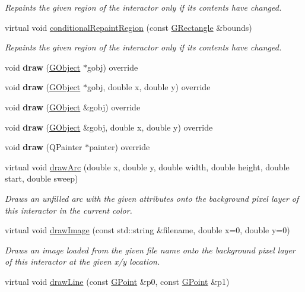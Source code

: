 \begin{DoxyCompactItemize}
\begin{DoxyCompactList}\small\item\em Repaints the given region of the interactor only if its contents have changed. \end{DoxyCompactList}\item 
virtual void \mbox{\hyperlink{classGDrawingSurface_a3932a12278752db368e24fa404e446aa}{conditional\+Repaint\+Region}} (const \mbox{\hyperlink{structGRectangle}{G\+Rectangle}} \&bounds)
\begin{DoxyCompactList}\small\item\em Repaints the given region of the interactor only if its contents have changed. \end{DoxyCompactList}\item 
void {\bfseries draw} (\mbox{\hyperlink{classGObject}{G\+Object}} $\ast$gobj) override
\item 
void {\bfseries draw} (\mbox{\hyperlink{classGObject}{G\+Object}} $\ast$gobj, double x, double y) override
\item 
void {\bfseries draw} (\mbox{\hyperlink{classGObject}{G\+Object}} \&gobj) override
\item 
void {\bfseries draw} (\mbox{\hyperlink{classGObject}{G\+Object}} \&gobj, double x, double y) override
\item 
void {\bfseries draw} (Q\+Painter $\ast$painter) override
\item 
virtual void \mbox{\hyperlink{classGDrawingSurface_a38b6fae1045191c57092b49905068144}{draw\+Arc}} (double x, double y, double width, double height, double start, double sweep)
\begin{DoxyCompactList}\small\item\em Draws an unfilled arc with the given attributes onto the background pixel layer of this interactor in the current color. \end{DoxyCompactList}\item 
virtual void \mbox{\hyperlink{classGDrawingSurface_abdd4cb1f2c64adc5d03522a1ee30febf}{draw\+Image}} (const std\+::string \&filename, double x=0, double y=0)
\begin{DoxyCompactList}\small\item\em Draws an image loaded from the given file name onto the background pixel layer of this interactor at the given x/y location. \end{DoxyCompactList}\item 
virtual void \mbox{\hyperlink{classGDrawingSurface_ae6a24b6b9a6e795d3165c1c750d5bdf1}{draw\+Line}} (const \mbox{\hyperlink{structGPoint}{G\+Point}} \&p0, const \mbox{\hyperlink{structGPoint}{G\+Point}} \&p1)

\end{DoxyCompactItemize}
